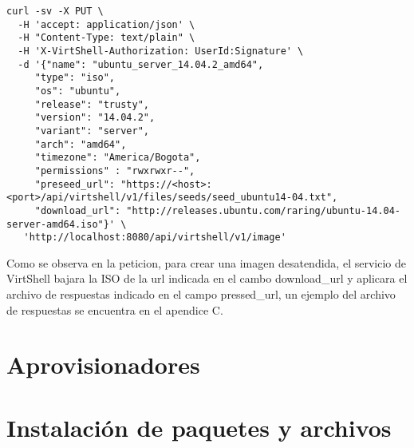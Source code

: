 \begin{lstlisting}[style=json, caption=Petición HTTP para crear una imagen]
curl -sv -X PUT \
  -H 'accept: application/json' \
  -H "Content-Type: text/plain" \
  -H 'X-VirtShell-Authorization: UserId:Signature' \
  -d '{"name": "ubuntu_server_14.04.2_amd64",
     "type": "iso",
     "os": "ubuntu", 
     "release": "trusty",
     "version": "14.04.2", 
     "variant": "server", 
     "arch": "amd64", 
     "timezone": "America/Bogota", 
     "permissions" : "rwxrwxr--",
     "preseed_url": "https://<host>:<port>/api/virtshell/v1/files/seeds/seed_ubuntu14-04.txt",
     "download_url": "http://releases.ubuntu.com/raring/ubuntu-14.04-server-amd64.iso"}' \
   'http://localhost:8080/api/virtshell/v1/image'
\end{lstlisting}

Como se observa en la peticion, para crear una imagen desatendida, el servicio de VirtShell bajara la ISO de la url indicada en el cambo download\_url y aplicara el archivo de respuestas indicado en el campo pressed\_url, un ejemplo del archivo de respuestas se encuentra en el apendice C.


\section{Aprovisionadores}

\section{Instalación de paquetes y archivos}



